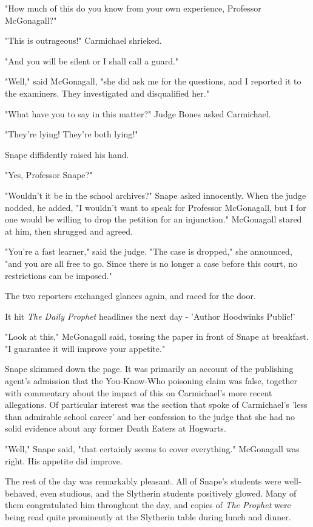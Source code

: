 \documentclass[a4paper,11pt]{article}
\begin{document}
"How much of this do you know from your own experience, Professor McGonagall?"

"This is outrageous!" Carmichael shrieked.

"And you will be silent or I shall call a guard."

"Well," said McGonagall, "she did ask me for the questions, and I reported it to the examiners. They investigated and disqualified her."

"What have you to say in this matter?" Judge Bones asked Carmichael.

"They're lying! They're both lying!"

Snape diffidently raised his hand.

"Yes, Professor Snape?"

"Wouldn't it be in the school archives?" Snape asked innocently. When the judge nodded, he added, "I wouldn't want to speak for Professor McGonagall, but I for one would be willing to drop the petition for an injunction." McGonagall stared at him, then shrugged and agreed.

"You're a fast learner," said the judge. "The case is dropped," she announced, "and you are all free to go. Since there is no longer a case before this court, no restrictions can be imposed."

The two reporters exchanged glances again, and raced for the door.

It hit \emph{The Daily Prophet} headlines the next day - 'Author Hoodwinks Public!'

"Look at this," McGonagall said, tossing the paper in front of Snape at breakfast. "I guarantee it will improve your appetite."

Snape skimmed down the page. It was primarily an account of the publishing agent's admission that the You-Know-Who poisoning claim was false, together with commentary about the impact of this on Carmichael's more recent allegations. Of particular interest was the section that spoke of Carmichael's 'less than admirable school career' and her confession to the judge that she had no solid evidence about any former Death Eaters at Hogwarts.

"Well," Snape said, "that certainly seems to cover everything." McGonagall was right. His appetite did improve.

The rest of the day was remarkably pleasant. All of Snape's students were well-behaved, even studious, and the Slytherin students positively glowed. Many of them congratulated him throughout the day, and copies of \emph{The Prophet} were being read quite prominently at the Slytherin table during lunch and dinner.
\end{document}
